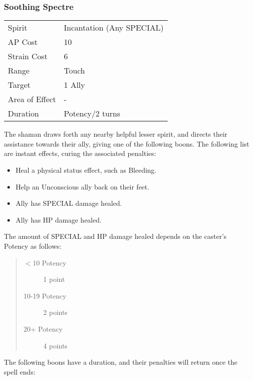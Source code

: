 \documentclass[11pt,a4paper,twocolumn]{book}
\begin{document}
\subsubsection*{Soothing Spectre}
{
	\begin{tabu} to 75mm{| X[l,4] | X[l,7] |}
		\hline
		Spirit         & Incantation (Any SPECIAL) \\
		AP Cost        & 10                        \\
		Strain Cost    & 6                         \\
		Range          & Touch                     \\
		Target         & 1 Ally                    \\
		Area of Effect & -                         \\
		Duration       & Potency/2 turns           \\ \hline
	\end{tabu}
	
}

\medskip

The shaman draws forth any nearby helpful lesser spirit, and directs their assistance towards their ally, giving one of the following boons. The following list are instant effects, curing the associated penalties:

\begin{itemize}
	\item Heal a physical status effect, such as Bleeding.
	\item Help an Unconscious ally back on their feet.
	\item Ally has SPECIAL damage healed.
	\item Ally has HP damage healed.
\end{itemize}

The amount of SPECIAL and HP damage healed depends on the caster's Potency as follows:

\begin{quote}
	\begin{description}
		\item[$<$10 Potency] 	1 point
		\item[10-19 Potency] 	2 points
		\item[20+ Potency] 	    4 points
	\end{description}
\end{quote}

The following boons have a duration, and their penalties will return once the spell ends:
\end{document}
